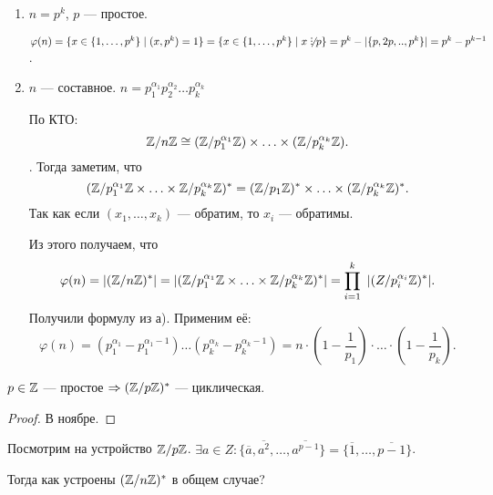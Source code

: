  \begin{enumerate}
     \item $n = p^k$, $p$ --- простое.

         $\varphi(n) = \{x \in \{1,\ldots,p^k\} \mid (x, p^k)=1\} = \{x \in \{1,\ldots, p^k\} \mid x \not \divby p\} = p^k - |\{p, 2p,..,p^k\}| = p^k - p^{k-1}$.
     \item $n$ --- составное. $n = p_1^{\alpha_1}p_2^{\alpha_2}\ldots p_k^{\alpha_k}$

         По КТО:  \[\mathbb{Z} / n\mathbb{Z} \cong (\mathbb{Z} / p_1^{\alpha_1} \mathbb{Z}) \times \ldots \times (\mathbb{Z} / p_k^{\alpha_k} \mathbb{Z}).\].
         Тогда заметим, что \[
             (\mathbb{Z} / p_1^{\alpha_1} \mathbb{Z} \times \ldots \times \mathbb{Z} / p_k^{\alpha_k} \mathbb{Z})^* = (\mathbb{Z} / p_1 \mathbb{Z})^* \times \ldots \times (\mathbb{Z} / p_k^{\alpha_k} \mathbb{Z})^*
         .\] Так как если $(x_1,\ldots,x_k)$ --- обратим, то $x_i$ --- обратимы.

         Из этого получаем, что  \[\varphi(n) = |(\mathbb{Z} / n\mathbb{Z})^*| = |(\mathbb{Z} / p_1^{\alpha_1} \mathbb{Z} \times \ldots \times \mathbb{Z} / p_k^{\alpha_k} \mathbb{Z})^*| = \prod_{i=1}^k\ |(Z / p_i^{\alpha_i} \mathbb{Z})^*|.\]
         Получили формулу из а). Применим её: \[
             \varphi(n) = (p_1^{\alpha_1} - p_1^{\alpha_1 - 1})\ldots(p_k^{\alpha_k} - p_k^{\alpha_k - 1}) = n \cdot (1 - \frac{1}{p_1})\cdot\ldots\cdot(1-\frac{1}{p_k})
         .\] 
 \end{enumerate}
 \begin{theorem}
     $p \in \mathbb{Z}$ --- простое  $\Rightarrow (\mathbb{Z} / p\mathbb{Z})^*$ --- циклическая.
 \end{theorem}
 \begin{proof}
     В ноябре.
 \end{proof}
 \slashn
 Посмотрим на устройство $\mathbb{Z} / p\mathbb{Z}$.  $\exists a \in Z: \{\overline{a}, \overline{a^2},\ldots,\overline{a^{p-1}}\} = \{\overline{1}, \ldots, \overline{p-1}\}$.

 Тогда как устроены $(\mathbb{Z} / n \mathbb{Z})^*$ в общем случае?

